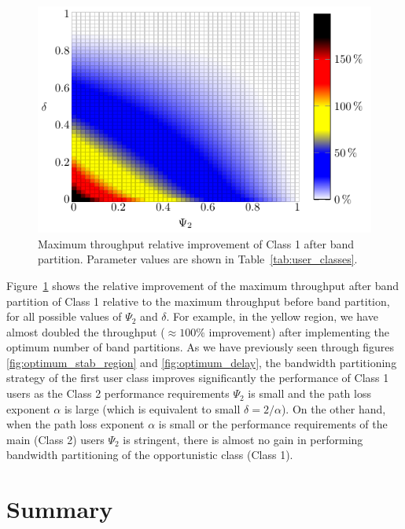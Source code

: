 %
\begin{figure}[!t]
	\centering
	\includegraphics[width=0.7\columnwidth]{./Figures/Ch7_a_ratio.pdf}%
	\caption{Maximum throughput relative improvement of Class 1 after band partition. Parameter values are shown in Table~\ref{tab:user_classes}.}
	\label{fig:a_ratio}
\end{figure}

% 		

Figure~\ref{fig:a_ratio} shows the relative improvement of the maximum throughput after band partition of Class 1 relative to the maximum throughput before band partition, for all possible values of $\Psi_2$ and $\delta$. For example, in the yellow region, we have almost doubled the throughput ($\approx 100\%$ improvement) after implementing the optimum number of band partitions. As we have previously seen through figures \ref{fig:optimum_stab_region} and \ref{fig:optimum_delay}, the bandwidth partitioning strategy of the first user class improves significantly the performance of Class 1 users as the Class 2 performance requirements $\Psi_2$ is small and the path loss exponent $\alpha$ is large (which is equivalent to small $\delta = 2/\alpha$). On the other hand, when the path loss exponent $\alpha$ is small or the performance requirements of the main (Class 2) users $\Psi_2$ is stringent, there is almost no gain in performing bandwidth partitioning of the opportunistic class (Class 1).

\section{Summary} \label{sec:summ_P2_03}

